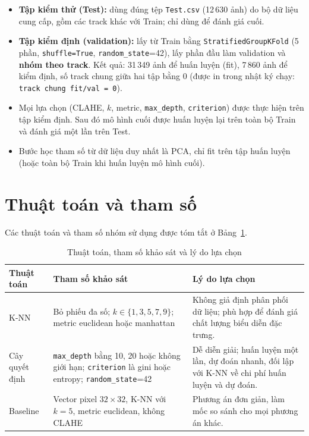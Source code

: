 \begin{itemize}
    \item \textbf{Tập kiểm thử (Test):} dùng đúng tệp \texttt{Test.csv} (12\,630 ảnh) do bộ dữ liệu cung cấp, gồm các track khác với Train; chỉ dùng để đánh giá cuối.
    \item \textbf{Tập kiểm định (validation):} lấy từ Train bằng \texttt{StratifiedGroupKFold} (5 phần, \texttt{shuffle=True}, \texttt{random\_state}=42), lấy phần đầu làm validation và \textbf{nhóm theo track}. Kết quả: 31\,349 ảnh để huấn luyện (fit), 7\,860 ảnh để kiểm định, số track chung giữa hai tập bằng 0 (được in trong nhật ký chạy: \texttt{track chung fit/val = 0}).
    \item Mọi lựa chọn (CLAHE, $k$, metric, \texttt{max\_depth}, \texttt{criterion}) được thực hiện trên tập kiểm định. Sau đó mô hình cuối được huấn luyện lại trên toàn bộ Train và đánh giá một lần trên Test.
    \item Bước học tham số từ dữ liệu duy nhất là PCA, chỉ fit trên tập huấn luyện (hoặc toàn bộ Train khi huấn luyện mô hình cuối).
\end{itemize}

\section{Thuật toán và tham số}

Các thuật toán và tham số nhóm sử dụng được tóm tắt ở Bảng~\ref{tab:thuat-toan}.

\begin{table}[H]
\centering
\caption{Thuật toán, tham số khảo sát và lý do lựa chọn}
\label{tab:thuat-toan}
\begin{tabular}{|p{2.6cm}|p{5.9cm}|p{6.5cm}|}
\hline
\textbf{Thuật toán} & \textbf{Tham số khảo sát} & \textbf{Lý do lựa chọn} \\
\hline
K-NN & Bỏ phiếu đa số; $k \in \{1,3,5,7,9\}$; metric euclidean hoặc manhattan & Không giả định phân phối dữ liệu; phù hợp để đánh giá chất lượng biểu diễn đặc trưng. \\
\hline
Cây quyết định & \texttt{max\_depth} bằng 10, 20 hoặc không giới hạn; \texttt{criterion} là gini hoặc entropy; \texttt{random\_state}=42 & Dễ diễn giải; huấn luyện một lần, dự đoán nhanh, đối lập với K-NN về chi phí huấn luyện và dự đoán. \\
\hline
Baseline & Vector pixel $32\times32$, K-NN với $k=5$, metric euclidean, không CLAHE & Phương án đơn giản, làm mốc so sánh cho mọi phương án khác. \\
\hline
\end{tabular}
\end{table}

